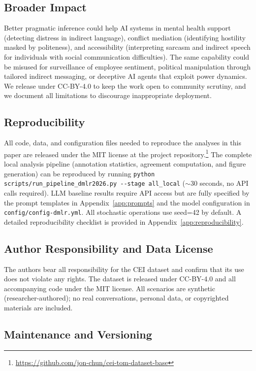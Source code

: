 \documentclass[twoside,11pt]{article}
\begin{document}
\subsection{Broader Impact}

Better pragmatic inference could help AI systems in mental health support (detecting distress in indirect language), conflict mediation (identifying hostility masked by politeness), and accessibility (interpreting sarcasm and indirect speech for individuals with social communication difficulties). The same capability could be misused for surveillance of employee sentiment, political manipulation through tailored indirect messaging, or deceptive AI agents that exploit power dynamics. We release under CC-BY-4.0 to keep the work open to community scrutiny, and we document all limitations to discourage inappropriate deployment.

\subsection{Reproducibility}

All code, data, and configuration files needed to reproduce the analyses in this paper are released under the MIT license at the project repository.\footnote{\url{https://github.com/jon-chun/cei-tom-dataset-base}} The complete local analysis pipeline (annotation statistics, agreement computation, and figure generation) can be reproduced by running \texttt{python scripts/run\_pipeline\_dmlr2026.py -{}-stage all\_local} ($\sim$30 seconds, no API calls required). LLM baseline results require API access but are fully specified by the prompt templates in Appendix~\ref{app:prompts} and the model configuration in \texttt{config/config-dmlr.yml}. All stochastic operations use seed=42 by default. A detailed reproducibility checklist is provided in Appendix~\ref{app:reproducibility}.

\subsection{Author Responsibility and Data License}

The authors bear all responsibility for the CEI dataset and confirm that its use does not violate any rights. The dataset is released under CC-BY-4.0 and all accompanying code under the MIT license. All scenarios are synthetic (researcher-authored); no real conversations, personal data, or copyrighted materials are included.

\subsection{Maintenance and Versioning}
\end{document}
